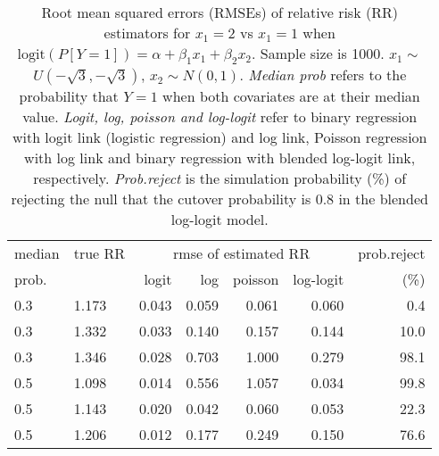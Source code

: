 \documentclass[12pt,a4paper]{article}
\begin{document}
\begin{table}[H] 
\small\sf\centering 
\caption{Root mean squared errors (RMSEs) of relative risk (RR) estimators for $x_1=2$ vs $x_1=1$ when $\mbox{logit}(P[Y=1])=\alpha+\beta_1 x_1 + \beta_2 x_2$. Sample size is 1000. $x_1 \sim $$U(-\sqrt{3},-\sqrt{3})$, $x_2 \sim N(0,1)$. {\it Median prob} refers to the probability that $Y=1$ when both covariates are at their median value. {\it Logit, log, poisson and log-logit} refer to binary regression with logit link (logistic regression) and log link, Poisson regression with log link and binary regression with blended log-logit link, respectively. {\it Prob.reject} is the simulation probability (\%) of rejecting the null that the cutover probability is $0.8$ in the blended log-logit model.} 
\begin{tabular}{llrrrrr} 
\toprule 
median & true RR & \multicolumn{4}{c}{rmse of estimated RR} & prob.reject \\ 
prob. & & logit & log & poisson & log-logit  & (\%) \\ \midrule 
0.3 & 1.173 & 0.043 & 0.059 & 0.061 & 0.060 &  0.4 \\  
0.3 & 1.332 & 0.033 & 0.140 & 0.157 & 0.144 & 10.0 \\  
0.3 & 1.346 & 0.028 & 0.703 & 1.000 & 0.279 & 98.1 \\  
0.5 & 1.098 & 0.014 & 0.556 & 1.057 & 0.034 & 99.8 \\  
0.5 & 1.143 & 0.020 & 0.042 & 0.060 & 0.053 & 22.3 \\  
0.5 & 1.206 & 0.012 & 0.177 & 0.249 & 0.150 & 76.6 \\  
\bottomrule 
\end{tabular} 
\end{table} 
\end{document}
